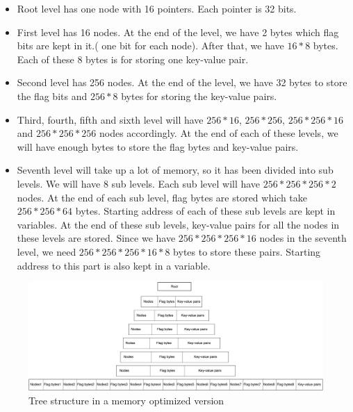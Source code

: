 \documentclass{report}
\begin{document}
\begin{itemize}
\item Root level has one node with 16 pointers. Each pointer is 32 bits.   
 \item First level has 16 nodes. At the end of the level, we have 2 bytes which flag bits are kept in it.( one bit for each node). After that, we have $16*8$ bytes. Each of these 8 bytes is for storing one key-value pair. 
 \item Second level has 256 nodes. At the end of the level, we have 32 bytes to store the flag bits and $256*8$ bytes for storing the key-value pairs. 
 \item Third, fourth, fifth and sixth level will have $256*16$, $256*256$, $256*256*16$ and $256*256*256$ nodes accordingly. At the end of each of these levels, we will have enough bytes to store the flag bytes and key-value pairs.
 \item Seventh level will take up a lot of memory, so it has been divided into sub levels. We will have 8 sub levels. Each sub level will have $256*256*256*2$ nodes. At the end of each sub level, flag bytes are stored which take $256*256*64$ bytes. Starting address of each of these sub levels are kept in variables. At the end of these sub levels, key-value pairs for all the nodes in these levels are stored. Since we have $256*256*256*16$ nodes in the seventh level, we need $256*256*256*16*8$ bytes to store these pairs. Starting address to this part is also kept in a variable.
\end{itemize}

\begin{figure}[h]
\includegraphics[scale=0.09]{treestructure3}
\caption{ Tree structure in a memory optimized version}
\centering

\end{figure}
\end{document}
